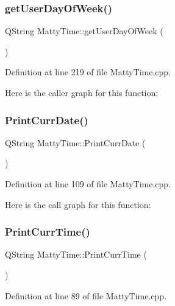 \subsubsection{\texorpdfstring{get\+User\+Day\+Of\+Week()}{getUserDayOfWeek()}}
{\footnotesize\ttfamily Q\+String Matty\+Time\+::get\+User\+Day\+Of\+Week (\begin{DoxyParamCaption}{ }\end{DoxyParamCaption})}



Definition at line 219 of file Matty\+Time.\+cpp.

Here is the caller graph for this function\+:
\hypertarget{classMattyTime_af87198affde58c9f254dbf1601fb9f1e}{}\label{classMattyTime_af87198affde58c9f254dbf1601fb9f1e} 
\subsubsection{\texorpdfstring{Print\+Curr\+Date()}{PrintCurrDate()}}
{\footnotesize\ttfamily Q\+String Matty\+Time\+::\+Print\+Curr\+Date (\begin{DoxyParamCaption}{ }\end{DoxyParamCaption})\hspace{0.3cm}{\ttfamily [static]}}



Definition at line 109 of file Matty\+Time.\+cpp.

Here is the call graph for this function\+:
\hypertarget{classMattyTime_ac5ecfd2ff5329b3476906b39bbf02ae3}{}\label{classMattyTime_ac5ecfd2ff5329b3476906b39bbf02ae3} 
\subsubsection{\texorpdfstring{Print\+Curr\+Time()}{PrintCurrTime()}}
{\footnotesize\ttfamily Q\+String Matty\+Time\+::\+Print\+Curr\+Time (\begin{DoxyParamCaption}{ }\end{DoxyParamCaption})\hspace{0.3cm}{\ttfamily [static]}}



Definition at line 89 of file Matty\+Time.\+cpp.

